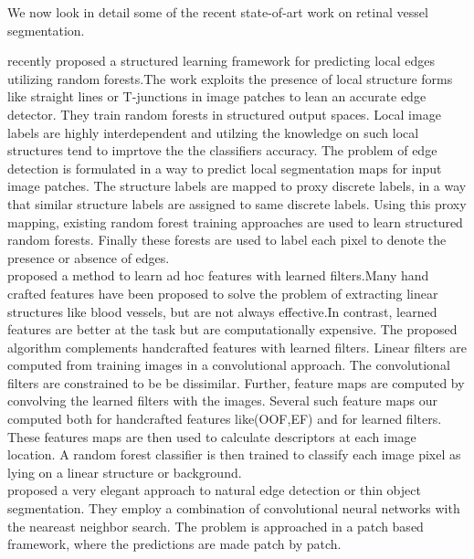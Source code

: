 We now look in detail some of the recent state-of-art work on retinal vessel segmentation.

\citet{dollar2013structured} recently proposed a structured learning framework for predicting local edges utilizing random forests.The work exploits the presence of local structure forms like straight lines or T-junctions in image patches to lean an accurate edge detector. They train random forests in structured output spaces. Local image labels are highly interdependent and utilzing the knowledge on such local structures tend to imprtove the the classifiers accuracy. The problem of edge detection is formulated in a way to predict local segmentation maps for input image patches.  The structure labels are mapped to proxy discrete labels, in a way that similar structure labels are assigned to same discrete labels. Using this proxy mapping, existing random forest training approaches are used to learn structured random forests. Finally these forests are used to label each pixel to denote the presence or absence of edges.\\

\citet{rigamonti2012accurate} proposed a method to learn ad hoc features with learned filters.Many hand crafted features have been proposed to solve the problem of extracting linear structures like blood vessels, but are not always effective.In contrast, learned features are better at the task but are computationally expensive. The proposed algorithm complements handcrafted features with learned filters. Linear filters are computed from training images in a convolutional approach. The convolutional filters are constrained to be be dissimilar. Further, feature maps are computed by convolving the learned filters with the images. Several such feature maps our computed both for handcrafted features like(OOF,EF) and for learned filters. These features maps are then used to calculate descriptors at each image location. A random forest classifier is then trained to classify each image pixel as lying on a linear structure or background.\\

\citet{ganin2014n} proposed a very elegant approach to natural edge detection or thin object segmentation. They employ a combination of convolutional neural networks with the neareast neighbor search. The problem is approached in a patch based framework, where the predictions are made patch by patch.